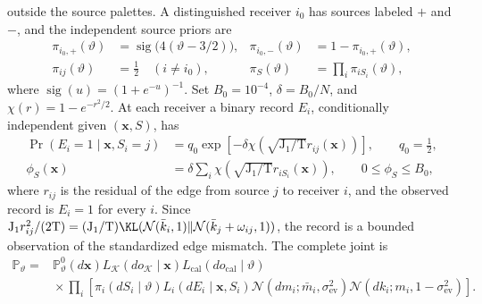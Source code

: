 outside the source palettes. A distinguished receiver \(i_0\) has sources
labeled \(+\) and \(-\), and the independent source priors are
\begin{equation}
\begin{aligned}
\pi_{i_0,+}(\vartheta)
  &=\operatorname{sig}\bigl(4(\vartheta-3/2)\bigr),&
\pi_{i_0,-}(\vartheta)&=1-\pi_{i_0,+}(\vartheta),\\
\pi_{ij}(\vartheta)&=\tfrac12\quad(i\ne i_0),&
\pi_S(\vartheta)&=\prod_i\pi_{iS_i}(\vartheta),
\end{aligned}
\label{eq:rg-formation-source-priors}
\end{equation}
where \(\operatorname{sig}(u)=(1+e^{-u})^{-1}\). Set
\(B_0=10^{-4}\), \(\delta=B_0/N\), and \(\chi(r)=1-e^{-r^2/2}\). At each
receiver a binary record \(E_i\), conditionally independent given
\((\mathbf x,S)\), has
\begin{equation}
\begin{aligned}
\Pr(E_i=1\mid\mathbf x,S_i=j)
  &=q_0\exp\left[-\delta\chi\left(\sqrt{\mathrm J_1/\mathrm T} r_{ij}(\mathbf x)\right)\right],
       \qquad q_0=\tfrac12,\\
\phi_S(\mathbf x)&=\delta\sum_i
       \chi\left(\sqrt{\mathrm J_1/\mathrm T} r_{iS_i}(\mathbf x)\right),
       \qquad 0\le\phi_S\le B_0,
\end{aligned}
\label{eq:rg-formation-source-record}
\end{equation}
where \(r_{ij}\) is the residual of the edge from source \(j\) to receiver
\(i\), and the observed record is \(E_i=1\) for every \(i\). Since
\(\mathrm J_1r_{ij}^2/(2\mathrm T)=(\mathrm J_1/\mathrm T)
\KL(\mathcal N(\bar k_i,1)\Vert\mathcal N(\bar k_j+\omega_{ij},1))\), the
record is a bounded observation of the standardized edge mismatch. The
complete joint is
\begin{equation}
\begin{aligned}
\mathbb P_\vartheta
={}&\mathbb P^0_\vartheta(d\mathbf x)
 L_{\mathcal K}(do_{\mathcal K}\mid\mathbf x)
 L_{\mathrm{cal}}(do_{\mathrm{cal}}\mid\vartheta)\\
&{}\times\prod_i\left[
 \pi_i(dS_i\mid\vartheta)L_i(dE_i\mid\mathbf x,S_i)
 \mathcal N(dm_i;\bar m_i,\sigma^2_{\mathrm{ev}})
 \mathcal N(dk_i;m_i,1-\sigma^2_{\mathrm{ev}})\right].
\end{aligned}
\label{eq:rg-formation-full-joint}
\end{equation}

